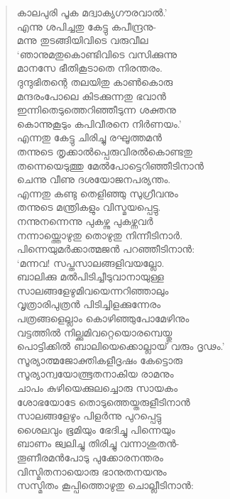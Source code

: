 \begin{verse}
കാലപുരി പൂക മദ്വാക്യഗൗരവാല്‍.’\\
എന്നു ശപിച്ചതു കേട്ടു കപീന്ദ്രനു-\\
മന്നു തുടങ്ങിയിവിടെ വരുവീല\\
‘ഞാനുമതുകൊണ്ടിവിടെ വസിക്കുന്നു\\
മാനസേ ഭീതികൂടാതെ നിരന്തരം.\\
ദുന്ദുഭിതന്റെ തലയിതു കാണ്‍കൊരു\\
മന്ദരംപോലെ കിടക്കുന്നതു ഭവാന്‍\\
ഇന്നിതെടുത്തെറിഞ്ഞീടുന്ന ശക്തനു\\
കൊന്നുകൂടും കപിവീരനെ നിര്‍ണയം.’\\
എന്നതു കേട്ടു ചിരിച്ചു രഘൂത്തമന്‍\\
തന്നുടെ തൃക്കാല്‍പ്പെരുവിരല്‍കൊണ്ടതു\\
തന്നെയെടുത്തു മേല്‍പോട്ടെറിഞ്ഞീടിനാന്‍\\
ചെന്നു വീണു ദശയോജനപര്യന്തം.\\
എന്നതു കണ്ടു തെളിഞ്ഞു സുഗ്രീവനും\\
തന്നുടെ മന്ത്രികളും വിസ്മയപ്പെട്ടു.\\
നന്നുനന്നെന്നു പുകഴ്ന്നു പുകഴ്ന്നവര്‍\\
നന്നായ്ത്തൊഴുതു തൊഴുതു നിന്നീടിനാര്‍.\\
പിന്നെയുമര്‍ക്കാത്മജന്‍ പറഞ്ഞീടിനാന്‍:\\
‘മന്നവ! സപ്തസാലങ്ങളിവയല്ലോ.\\
ബാലിക്കു മല്‍പിടിച്ചീടുവാനായുള്ള\\
സാലങ്ങളേഴുമിവയെന്നറിഞ്ഞാലും\\
വൃത്രാരിപുത്രന്‍ പിടിച്ചിളക്കുന്നേരം\\
പത്രങ്ങളെല്ലാം കൊഴിഞ്ഞുപോമേഴിനും\\
വട്ടത്തില്‍ നില്ക്കുമിവറ്റെയൊരമ്പെയ്തു\\
പൊട്ടിക്കില്‍ ബാലിയെക്കൊല്ലായ് വരും ദൃഢം.’\\
സൂര്യാത്മജോക്തികളീദൃഷം കേട്ടൊരു\\
സൂര്യാന്വയോത്ഭൂതനാകിയ രാമനും\\
ചാപം കുഴിയെക്കുലച്ചൊരു സായകം\\
ശോഭയോടേ തൊടുത്തെയ്തരുളീടിനാന്‍\\
സാലങ്ങളേഴും പിളര്‍ന്നു പുറപ്പെട്ടു\\
ശൈലവും ഭൂമിയും ഭേദിച്ചു പിന്നെയും\\
ബാണം ജ്വലിച്ചു തിരിച്ചു വന്നാശുതന്‍-\\
തൂണീരമന്‍പോടു പുക്കോരനന്തരം\\
വിസ്മിതനായൊരു ഭാനുതനയനും\\
സസ്മിതം കൂപ്പിത്തൊഴുതു ചൊല്ലീടിനാന്‍:\\

\end{verse}
